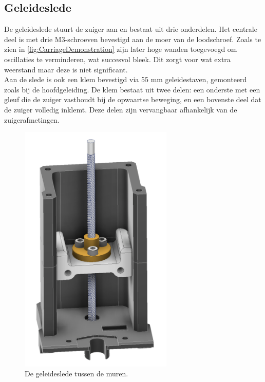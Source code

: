 \subsection{Geleideslede}
De geleideslede stuurt de zuiger aan en bestaat uit drie onderdelen. Het centrale deel is met drie M3-schroeven bevestigd aan de moer van de loodschroef. Zoals te zien in \autoref{fig:CarriageDemonstration} zijn later hoge wanden toegevoegd om oscillaties te verminderen, wat succesvol bleek. Dit zorgt voor wat extra weerstand maar deze is niet significant.
\\[12pt]Aan de slede is ook een klem bevestigd via 55 mm geleidestaven, gemonteerd zoals bij de hoofdgeleiding. De klem bestaat uit twee delen: een onderste met een gleuf die de zuiger vasthoudt bij de opwaartse beweging, en een bovenste deel dat de zuiger volledig inklemt. Deze delen zijn vervangbaar afhankelijk van de zuigerafmetingen.
\\[12pt]\begin{minipage}[t]{0.39\textwidth}
    \vspace{0pt}
    \begin{figure}[H]
        \centering
        \includegraphics[width=0.65\textwidth]{figures/CarriageDemonstration.png}
        \caption{De geleideslede tussen de muren.}\label{fig:CarriageDemonstration}
    \end{figure}
\end{minipage}
